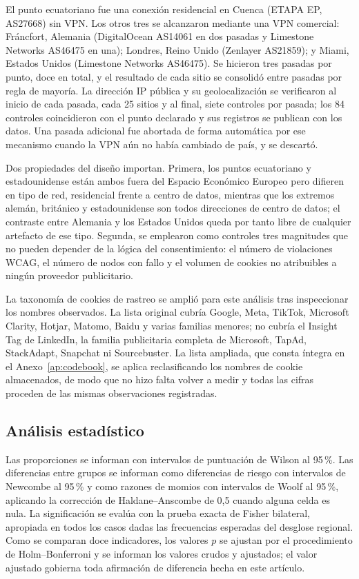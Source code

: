\documentclass[pdflatex,sn-basic,Numbered]{sn-jnl}
\theoremstyle{thmstyleone}
\theoremstyle{thmstyletwo}
\theoremstyle{thmstylethree}
\begin{document}
El punto ecuatoriano fue una conexi\'on residencial en Cuenca (ETAPA EP, AS27668) sin VPN. Los otros tres se alcanzaron mediante una VPN comercial: Fr\'ancfort, Alemania (DigitalOcean AS14061 en dos pasadas y Limestone Networks AS46475 en una); Londres, Reino Unido (Zenlayer AS21859); y Miami, Estados Unidos (Limestone Networks AS46475). Se hicieron tres pasadas por punto, doce en total, y el resultado de cada sitio se consolid\'o entre pasadas por regla de mayor\'ia. La direcci\'on IP p\'ublica y su geolocalizaci\'on se verificaron al inicio de cada pasada, cada 25 sitios y al final, siete controles por pasada; los 84 controles coincidieron con el punto declarado y sus registros se publican con los datos. Una pasada adicional fue abortada de forma autom\'atica por ese mecanismo cuando la VPN a\'un no hab\'ia cambiado de pa\'is, y se descart\'o.

Dos propiedades del dise\~no importan. Primera, los puntos ecuatoriano y estadounidense est\'an ambos fuera del Espacio Econ\'omico Europeo pero difieren en tipo de red, residencial frente a centro de datos, mientras que los extremos alem\'an, brit\'anico y estadounidense son todos direcciones de centro de datos; el contraste entre Alemania y los Estados Unidos queda por tanto libre de cualquier artefacto de ese tipo. Segunda, se emplearon como controles tres magnitudes que no pueden depender de la l\'ogica del consentimiento: el n\'umero de violaciones WCAG, el n\'umero de nodos con fallo y el volumen de cookies no atribuibles a ning\'un proveedor publicitario.

La taxonom\'ia de cookies de rastreo se ampli\'o para este an\'alisis tras inspeccionar los nombres observados. La lista original cubr\'ia Google, Meta, TikTok, Microsoft Clarity, Hotjar, Matomo, Baidu y varias familias menores; no cubr\'ia el Insight Tag de LinkedIn, la familia publicitaria completa de Microsoft, TapAd, StackAdapt, Snapchat ni Sourcebuster. La lista ampliada, que consta \'integra en el Anexo~\ref{ap:codebook}, se aplica reclasificando los nombres de cookie almacenados, de modo que no hizo falta volver a medir y todas las cifras proceden de las mismas observaciones registradas.

\subsection{An\'alisis estad\'istico}\label{sec:methods-stats}

Las proporciones se informan con intervalos de puntuaci\'on de Wilson al 95\,\%. Las diferencias entre grupos se informan como diferencias de riesgo con intervalos de Newcombe al 95\,\% y como razones de momios con intervalos de Woolf al 95\,\%, aplicando la correcci\'on de Haldane--Anscombe de 0,5 cuando alguna celda es nula. La significaci\'on se eval\'ua con la prueba exacta de Fisher bilateral, apropiada en todos los casos dadas las frecuencias esperadas del desglose regional. Como se comparan doce indicadores, los valores $p$ se ajustan por el procedimiento de Holm--Bonferroni y se informan los valores crudos y ajustados; el valor ajustado gobierna toda afirmaci\'on de diferencia hecha en este art\'iculo.
\end{document}
